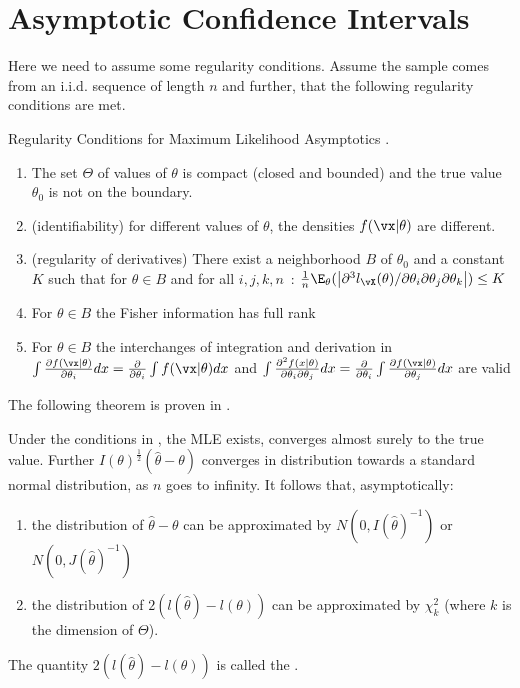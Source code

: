 \section{Asymptotic Confidence Intervals} 
Here we need to assume some regularity
conditions. Assume the sample comes from an
i.i.d. sequence of length $n$ and further, that
the following regularity conditions are met.
\begin{definition}
Regularity Conditions for Maximum Likelihood Asymptotics
\cite{davison2003sm}.
\begin{enumerate}
  \item The set $\Theta$ of values of $\theta$ is compact
  (closed and bounded) and the true value $\theta_0$ is not on
  the boundary.
  \item (identifiability) for different values of $\theta$,
      the densities $f(\vx|\theta)$ are different.
  \item (regularity of derivatives) There exist a
      neighborhood $B$ of $\theta_0$ and a constant $K$
      such that for $\theta \in B$  and for all $i,j,k,n$~:
      $\frac{1}{n}\E_{\theta}(
      \left|\partial^3l_{\vX}(\theta)/\partial\theta_i\partial\theta_j\partial\theta_k\right|)\leq
      K$
  \item For
  $\theta \in B$ the Fisher information has
  full rank
  \item For $\theta \in B$ the interchanges of integration
      and derivation in $\int \frac{\partial
      f(\vx|\theta)}{\partial \theta_i}  dx= \frac{\partial
      }{\partial \theta_i} \int f(\vx|\theta) dx$ and $
      \int \frac{\partial^2 f(x|\theta)}{\partial \theta_i
      \partial \theta_j}  dx= \frac{\partial }{\partial
      \theta_i} \int \frac{\partial
      f({\vx}|\theta)}{\partial \theta_j} dx $ are valid
  \end{enumerate}
\end{definition}
The following theorem is proven in \cite{davison2003sm}.

\begin{shadethm}
Under the conditions in , the MLE exists, converges
almost surely to the true value. Further $I(\theta)^{\frac{1}{2}}
(\hat{\theta} - \theta)$ converges in distribution towards a
standard normal distribution, as $n$ goes to infinity. It follows
that, asymptotically:
\begin{enumerate}
  \item the distribution of $\hat{\theta}-\theta$ can be approximated by
$N\left(0, I(\hat{\theta})^{-1}\right)$ or $N\left(0,
J(\hat{\theta})^{-1}\right)$
  \item the distribution of $2\left(l(\hat{\theta})-l(\theta)\right)$ can be approximated by  $\chi^2_k$  (where $k$ is the dimension
  of $\Theta$).
\end{enumerate}
\end{shadethm}
The quantity $2\left(l(\hat{\theta})-l(\theta)\right)$ is called
the .

